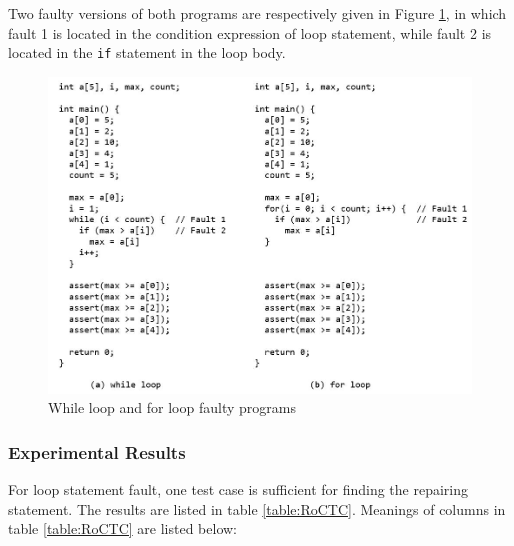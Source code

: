 Two faulty versions of both programs are respectively given in Figure \ref{fig:WaF}, in which fault 1 is located in the condition expression of loop statement, while fault 2 is located in the \lstinline|if| statement in the loop body.

\begin{figure}
\centering
\includegraphics[width=5in]{img/Fig5-1.jpg}
\caption{While loop and for loop faulty programs}
\label{fig:WaF}
\end{figure}

\subsubsection{Experimental Results}
For loop statement fault, one test case is sufficient for finding the repairing statement.
The results are listed in table \ref{table:RoCTC}. Meanings of columns in table \ref{table:RoCTC} are listed below:

